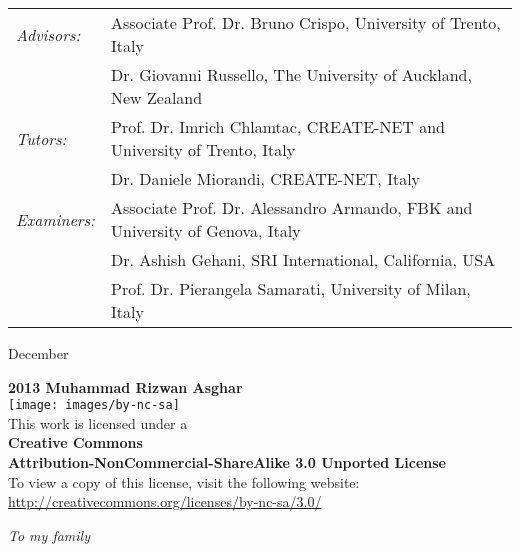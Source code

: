 \documentclass[epsfig,a4paper,11pt,titlepage]{book}
\newenvironment{license}
  {\clearpage           \thispagestyle{empty}\vspace*{\stretch{3}}\raggedright          }
  {\par \vspace{\stretch{1}} \clearpage           }
\newenvironment{dedication}
  {\clearpage           \thispagestyle{empty}\vspace*{\stretch{1}}\itshape             \raggedleft          }
  {\par \vspace{\stretch{3}} \clearpage           }
\newcommand{\clearemptydoublepage}{\newpage{\pagestyle{empty}\cleardoublepage}}
\numberwithin{algorithm}{chapter}
\newenvironment{changemargin}[3]{\begin{list}{}{\setlength{\topsep}{0pt}\setlength{\leftmargin}{#1}\setlength{\rightmargin}{#2}\setlength{\topmargin}{#3}\setlength{\listparindent}{\parindent}\setlength{\itemindent}{\parindent}\setlength{\parsep}{\parskip}}\item[]}{\end{list}}
\begin{document}
\begin{changemargin}{-7mm}{-7mm}{0mm}
\begin{center}
{
\large
\begin{tabular}{ll}
\textit{Advisors:} & 
Associate Prof. Dr. Bruno Crispo, University of Trento, Italy \vspace{1mm} \\
& Dr. Giovanni Russello, The University of Auckland, New Zealand \vspace{1mm} \\
\textit{Tutors:} & 
Prof. Dr. Imrich Chlamtac, CREATE-NET and University of Trento, Italy \vspace{1mm} \\
& Dr. Daniele Miorandi, CREATE-NET, Italy \vspace{1mm} \\
\textit{Examiners:}
& Associate Prof. Dr. Alessandro Armando, FBK and University of Genova, Italy \vspace{1mm} \\
& Dr. Ashish Gehani, SRI International, California, USA \vspace{1mm} \\
& Prof. Dr. Pierangela Samarati, University of Milan, Italy
\end{tabular}
}

\hrulefill

\normalsize
December 
\end{center}
\end{changemargin}

\newpage
\clearemptydoublepage
\thispagestyle{empty}
\begin{license}
\textbf{ 2013 Muhammad Rizwan Asghar} \\
\vspace{4mm}
\texttt{[image: images/by-nc-sa]} \\
\vspace{2mm}
This work is licensed under a \\ 
\vspace{2mm}
\textbf{Creative Commons \\ Attribution-NonCommercial-ShareAlike 3.0 Unported License} \\
\vspace{2mm}
To view a copy of this license, visit the following website: \\
\url{http://creativecommons.org/licenses/by-nc-sa/3.0/}
\end{license}

\newpage
\clearemptydoublepage
\thispagestyle{empty}
\begin{dedication}
To my family
\end{dedication}
\end{document}
